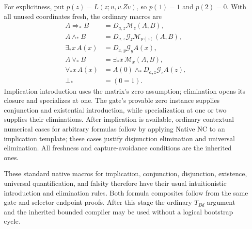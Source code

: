 For explicitness, put $p(z)=L(z;u,v.Zv)$, so $p(1)=1$ and
$p(2)=0$. With all unused coordinates fresh, the ordinary macros are
\begin{align*}
 A\Rightarrow_*B&=D_{a,z}\mathcal M_z(A,B),\\
 A\wedge_*B&=D_{a,z}\mathcal G_z\mathcal M_{p(z)}(A,B),\\
 \exists_*x\,A(x)&=D_{x,y}\mathcal G_y A(x),\\
 A\vee_*B&=\exists_*x\,\mathcal M_x(A,B),\\
 \forall_*x\,A(x)&=A(0)\wedge_*D_{a,z}\mathcal G_z A(z),\\
 \bot_*&=(0=1).
\end{align*}
Implication introduction uses the matrix's zero assumption; elimination
opens its closure and specializes at one. The gate's provable zero
instance supplies conjunction and existential introduction, while
specialization at one or two supplies their eliminations. After implication
is available, ordinary contextual numerical cases for arbitrary formulas
follow by applying Native NC to an implication template; these cases
justify disjunction elimination and universal elimination. All freshness
and capture-avoidance conditions are the inherited ones.

These standard native macros for implication, conjunction, disjunction,
existence, universal quantification, and falsity therefore have their usual
intuitionistic introduction and elimination rules. Both formula
composites follow from the same gate and selector endpoint proofs.
After this stage the ordinary $T_{Bd}$ argument and the inherited
bounded compiler may be used without a logical bootstrap cycle.

